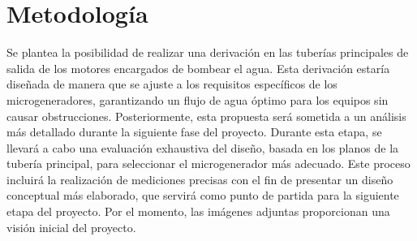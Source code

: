 \documentclass[11pt]{article}
\begin{document}
    \section{Metodología}
    Se plantea la posibilidad de realizar una derivación en las tuberías principales de salida de
    los motores encargados de bombear el agua. Esta derivación estaría diseñada de manera
    que se ajuste a los requisitos específicos de los microgeneradores, garantizando un flujo de
    agua óptimo para los equipos sin causar obstrucciones. Posteriormente, esta propuesta
    será sometida a un análisis más detallado durante la siguiente fase del proyecto. Durante
    esta etapa, se llevará a cabo una evaluación exhaustiva del diseño, basada en los planos
    de la tubería principal, para seleccionar el microgenerador más adecuado. Este proceso
    incluirá la realización de mediciones precisas con el fin de presentar un diseño conceptual
    más elaborado, que servirá como punto de partida para la siguiente etapa del proyecto. Por
    el momento, las imágenes adjuntas proporcionan una visión inicial del proyecto.
\end{document}
